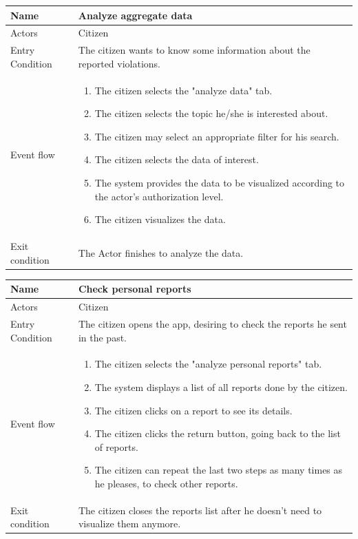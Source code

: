 \vskip 0.2in
\begin{tabular}{|p{3.1cm}|p{11.6cm}|}
\hline
Name & Analyze aggregate data\\
\hline
Actors & Citizen\\
\hline
Entry Condition & The citizen wants to know some information about the reported violations.\\
\hline
Event flow & \begin{enumerate}
                \item The citizen selects the "analyze data" tab.
                \item The citizen selects the topic he/she is interested about.
                \item The citizen may select an appropriate filter for his search.
                \item The citizen selects the data of interest.
                \item The system provides the data to be visualized according to the actor's authorization level.
                \item The citizen visualizes the data.
            \end{enumerate}\\
\hline
Exit condition & The Actor finishes to analyze the data.\\
\hline
\end{tabular}

\vskip 0.2in
\begin{tabular}{|p{3.1cm}|p{11.6cm}|}
	\hline
	Name & Check personal reports\\
	\hline
	Actors & Citizen\\
	\hline
	Entry Condition & The citizen opens the app, desiring to check the reports he sent in the past.\\
	\hline
	Event flow & \begin{enumerate}
		\item The citizen selects the "analyze personal reports" tab.
		\item The system displays a list of all reports done by the citizen.
		\item The citizen clicks on a report to see its details.
		\item The citizen clicks the return button, going back to the list of reports.
		\item The citizen can repeat the last two steps as many times as he pleases, to check other reports.
	\end{enumerate}\\
	\hline
	Exit condition & The citizen closes the reports list after he doesn't need to visualize them anymore.\\
	\hline
\end{tabular}

